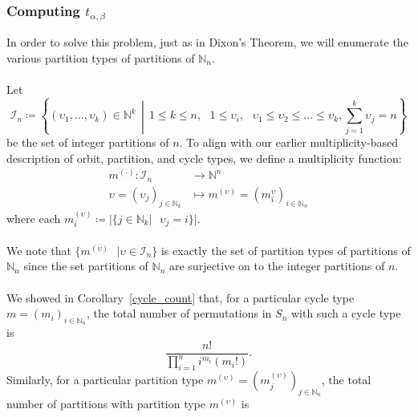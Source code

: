 \subsubsection{Computing $t_{\alpha, \beta}$}
In order to solve this problem, just as in Dixon's Theorem, we will
enumerate the various partition types of partitions of $\mathbb{N}_n$. \\\\Let
\[
  \mathcal{I}_n \coloneqq \left\{ (\upsilon_1, \dots, \upsilon_k)\in\mathbb{N}^k
    \,\middle|\, 1 \le k \le n,\text{ }1\le\upsilon_i,\text{ }
    \upsilon_1\le\upsilon_2\le\dots\le\upsilon_k,
  \sum_{j=1}^k{\upsilon_j} = n \right\}
\]
be the set of integer partitions of $n$. To align with our earlier
multiplicity-based description of orbit, partition, and cycle types,
we define a multiplicity function:
\begin{align*}
  m^{(\cdot)}:\mathcal{I}_n &\to \mathbb{N}^n
  \\ \upsilon=(\upsilon_j)_{j\in\mathbb{N}_k} &\mapsto m^{(\upsilon)}
  = (m_i^{\upsilon})_{i\in\mathbb{N}_n}
\end{align*}
where each $m_i^{(\upsilon)}\coloneq |\{j\in\mathbb{N}_k\text{
}|\text{ }\upsilon_j = i\}|$.
\\\\We note that $\{m^{(\upsilon)}\text{ }|\text{
}\upsilon\in\mathcal{I}_n\}$ is exactly the set of partition types of
partitions of $\mathbb{N}_n$ since the set partitions of
$\mathbb{N}_n$ are surjective on to the integer partitions of $n$.
\\\\We showed in Corollary~\ref{cycle_count} that, for a particular
cycle type $m = (m_i)_{i\in\mathbb{N}_n}$, the
total number of permutations in $S_n$ with such a cycle type is
\[
  \frac{n!}{\prod_{i=1}^ni^{m_i}(m_i!)}.
\]
Similarly, for a particular partition type $m^{(\upsilon)} =
(m_j^{(\upsilon)})_{j\in\mathbb{N}_n}$, the total number of
partitions with partition type $m^{(\upsilon)}$ is
